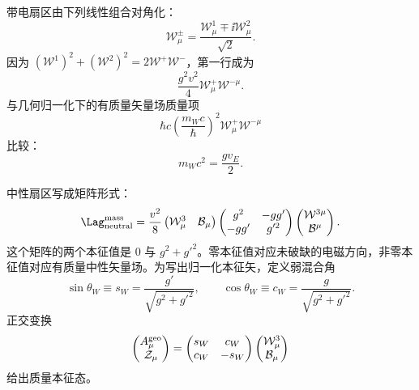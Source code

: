 \begin{proposition}[带电规范场的质量]
带电扇区由下列线性组合对角化：
\begin{equation}
 {
 \mathcal W_\mu^\pm
 =\frac{\mathcal W_\mu^1\mp\ii\mathcal W_\mu^2}{\sqrt2}.}
 \label{eq:wpm-definition-dp11}
\end{equation}
因为 $(\mathcal W^1)^2+(\mathcal W^2)^2=2\mathcal W^+\mathcal W^-$，第一行成为
\begin{equation*}
 \frac{g^2v^2}{4}\mathcal W_\mu^+\mathcal W^{-\mu}.
\end{equation*}
与几何归一化下的有质量矢量场质量项
\begin{equation*}
 \hbar c\left(\frac{m_Wc}{\hbar}\right)^2
 \mathcal W_\mu^+\mathcal W^{-\mu}
\end{equation*}
比较：
\begin{equation}
 {m_Wc^2=\frac{gv_E}{2}.}
 \label{eq:sm-w-mass-dp11}
\end{equation}
\end{proposition}

\begin{proposition}[中性质量矩阵的正交对角化]
中性扇区写成矩阵形式：
\begin{equation}
 \Lag_{\rm neutral}^{\rm mass}
 =\frac{v^2}{8}
 \begin{pmatrix}\mathcal W_\mu^3&\mathcal B_\mu\end{pmatrix}
 \begin{pmatrix}g^2&-gg'\\-gg'&g'^2\end{pmatrix}
 \begin{pmatrix}\mathcal W^{3\mu}\\\mathcal B^\mu\end{pmatrix}.
 \label{eq:neutral-mass-matrix-dp11}
\end{equation}
这个矩阵的两个本征值是 $0$ 与 $g^2+g'^2$。零本征值对应未破缺的电磁方向，非零本征值对应有质量中性矢量场。为写出归一化本征矢，定义弱混合角
\begin{equation}
 {
 \sin\theta_W\equiv s_W=\frac{g'}{\sqrt{g^2+g'^2}},
 \qquad
 \cos\theta_W\equiv c_W=\frac{g}{\sqrt{g^2+g'^2}}.}
 \label{eq:weak-angle-dp11}
\end{equation}
正交变换
\begin{equation}
 {
 \begin{pmatrix}A_\mu^{\rm geo}\\\mathcal Z_\mu\end{pmatrix}
 =\begin{pmatrix}s_W&c_W\\c_W&-s_W\end{pmatrix}
 \begin{pmatrix}\mathcal W_\mu^3\\\mathcal B_\mu\end{pmatrix}}
 \label{eq:az-mixing-dp11}
\end{equation}
给出质量本征态。
\end{proposition}


